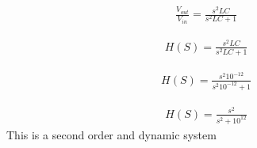 \documentclass{article}
\begin{document}
\begin{equation*}
    \begin{aligned}
        \frac{V_{out}}{V_{in}} = \frac{s^2LC}{s^2LC + 1}
    \end{aligned}
\end{equation*}

\begin{equation*}
    \begin{aligned}
        H(S) = \frac{s^2LC}{s^2LC + 1}
    \end{aligned}
\end{equation*}

\begin{equation*}
    \begin{aligned}
        H(S) = \frac{s^2 10^{-12}}{s^2 10^{-12} + 1}
    \end{aligned}
\end{equation*}

\begin{equation*}
    \begin{aligned}
        H(S) = \frac{s^2}{s^2 + 10^{12}}
    \end{aligned}
\end{equation*}
This is a second order and dynamic system
\end{document}
